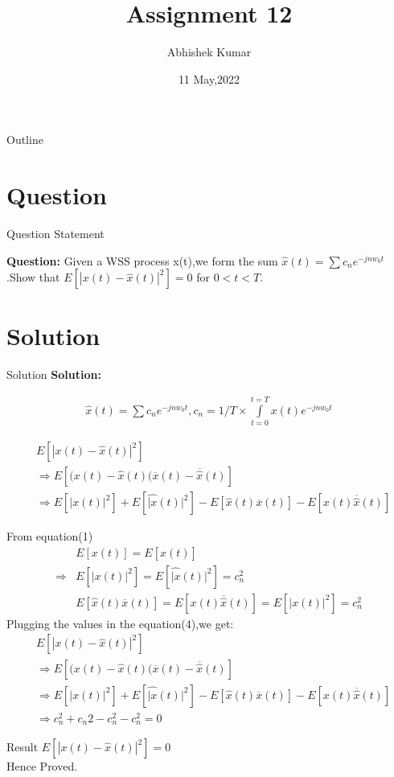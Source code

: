 \documentclass{beamer}
\title{Assignment 12}
\author{Abhishek Kumar}
\institute{IIT Hyderabad}
\date{11 May,2022}
\newcommand{\Int}{\int\limits}
\begin{document}
	\begin{frame}
		\titlepage
	\end{frame}
	\begin{frame}{Outline}
		\tableofcontents
	\end{frame}
	\section{Question}
	\begin{frame}{Question Statement}
		
		\textbf{Question:} Given a WSS process x(t),we form the sum $\hat{x}(t)=\sum c_ne^{-jnw_0t}$.Show that $E[|x(t)-\hat{x}(t)|^{2}]=0$
		for $0<t<T$.
	\end{frame}
	\section{Solution}
	\begin{frame}{Solution}
		\textbf{Solution:}
		
		\begin{align}
			\hat{x}(t)=\sum c_ne^{-jnw_0t} ,c_n=1/T \times \Int_{t=0}^{t=T}x(t)e^{-jnw_0t}
		\end{align}
		
		\begin{align}
			&E[|x(t)-\hat{x}(t)|^{2}]\\
			&\Rightarrow E[(x(t)-\hat{x}(t)(\overline{x}(t)-\overline{\hat{x}}(t)]\\
			&\Rightarrow E[|x(t)|^{2}]+E[\hat{|x}(t)|^{2}]-E[\hat{x}(t)\overline{x}(t)]-E[{x}(t)\overline{\hat{x}}(t)]
		\end{align}
		
	\end{frame}
	\begin{frame}
		From equation(1)
		\begin{align}
			&E[x(t)]=E[\hat{x}(t)]\\
			\Rightarrow  &E[|x(t)|^{2}]=E[\hat{|x}(t)|^{2}]=c_n^{2}\\
			&E[\hat{x}(t)\overline{x}(t)]=E[{x}(t)\overline{\hat{x}}(t)]=E[|x(t)|^{2}]=c_n^{2}
		\end{align}
		Plugging the values in the equation(4),we get:\\
		
		\begin{align}
			&E[|x(t)-\hat{x}(t)|^{2}]\\
			&\Rightarrow E[(x(t)-\hat{x}(t)(\overline{x}(t)-\overline{\hat{x}}(t)]\\
			&\Rightarrow E[|x(t)|^{2}]+E[\hat{|x}(t)|^{2}]-E[\hat{x}(t)\overline{x}(t)]-E[{x}(t)\overline{\hat{x}}(t)]\\
			&\Rightarrow c_n^{2}+c_n{2} -c_n^{2}-c_n^{2}=0
		\end{align}
		\begin{alertblock}{Result}
			$E[|x(t)-\hat{x}(t)|^{2}]=0$ \\
			Hence Proved.
		\end{alertblock}
	\end{frame}
	
\end{document}
